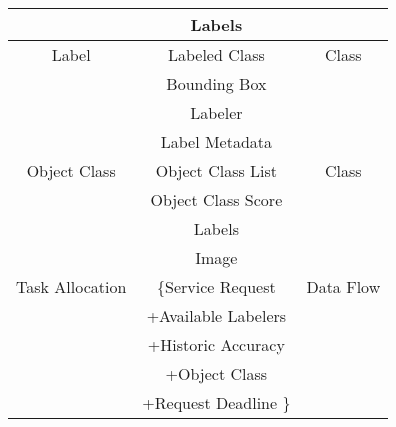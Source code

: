 \documentclass[12pt]{article}
\begin{document}
\begin{center}
\begin{tabular}{ |c|c|c| }
    &  Labels & \\
    \hline
    Label &  Labeled Class & Class \\ 
    &  Bounding Box & \\
    &  Labeler & \\
    &  Label Metadata & \\
    \hline
    Object Class &  Object Class List & Class \\ 
    &  Object Class Score & \\
    &  Labels & \\
    &  Image & \\
    \hline
    Task Allocation &  \{Service Request & Data Flow \\ 
    &  +Available Labelers & \\
    &  +Historic Accuracy & \\
    &  +Object Class & \\
    &  +Request Deadline \} & \\
    \hline
    
    
\end{tabular}
\end{center}
\end{document}
